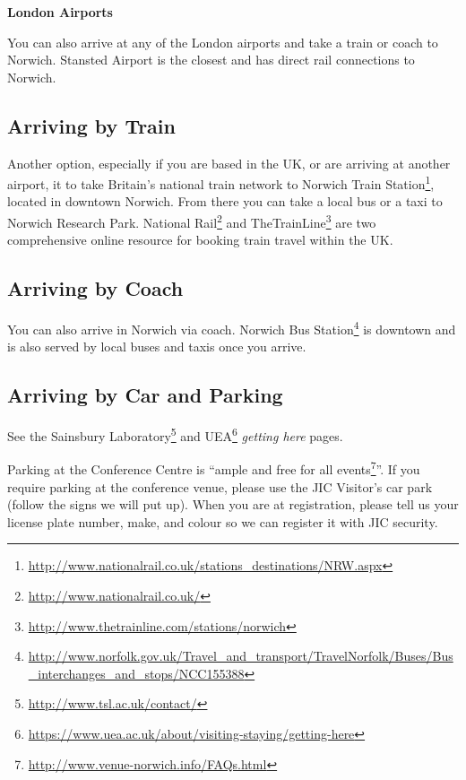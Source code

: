 \documentclass[12pt,]{book}
\let\rmarkdownfootnote\footnote%
\def\footnote{\protect\rmarkdownfootnote}
\renewcommand{\href}[2]{#2\footnote{\url{#1}}}
\theoremstyle{definition}
\theoremstyle{definition}
\theoremstyle{remark}
\begin{document}
\textbf{London Airports}

You can also arrive at any of the London airports and take a train or
coach to Norwich. Stansted Airport is the closest and has direct rail
connections to Norwich.

\subsection*{Arriving by Train}\label{arriving-by-train}

Another option, especially if you are based in the UK, or are arriving
at another airport, it to take Britain's national train network to
\href{http://www.nationalrail.co.uk/stations_destinations/NRW.aspx}{Norwich
Train Station}, located in downtown Norwich. From there you can take a
local bus or a taxi to Norwich Research Park.
\href{http://www.nationalrail.co.uk/}{National Rail} and
\href{http://www.thetrainline.com/stations/norwich}{TheTrainLine} are
two comprehensive online resource for booking train travel within the
UK.

\subsection*{Arriving by Coach}\label{arriving-by-coach}

You can also arrive in Norwich via coach.
\href{http://www.norfolk.gov.uk/Travel_and_transport/TravelNorfolk/Buses/Bus_interchanges_and_stops/NCC155388}{Norwich
Bus Station} is downtown and is also served by local buses and taxis
once you arrive.

\subsection*{Arriving by Car and
Parking}\label{arriving-by-car-and-parking}

See the \href{http://www.tsl.ac.uk/contact/}{Sainsbury Laboratory} and
\href{https://www.uea.ac.uk/about/visiting-staying/getting-here}{UEA}
\emph{getting here} pages.

Parking at the Conference Centre is
``\href{http://www.venue-norwich.info/FAQs.html}{ample and free for all
events}''. If you require parking at the conference venue, please use
the JIC Visitor's car park (follow the signs we will put up). When you
are at registration, please tell us your license plate number, make, and
colour so we can register it with JIC security.
\end{document}
